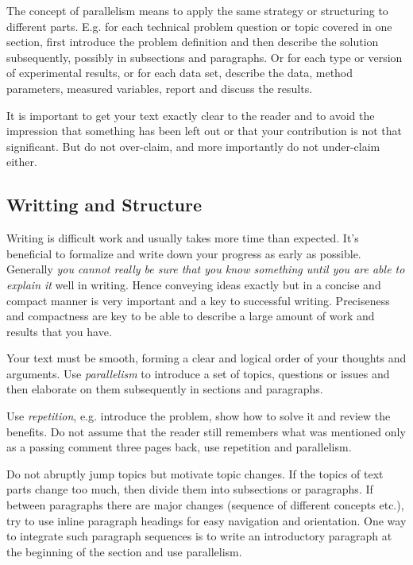 \documentclass[11pt, a4paper,oneside,chapterprefix=false]{scrbook}
\begin{document}
The concept of parallelism means to apply the same strategy or structuring to different parts. E.g. for each technical problem question or topic covered in one section, first introduce the problem definition and then describe the solution subsequently, possibly in subsections and paragraphs. Or for each type or version of experimental results, or for each data set, describe the data, method parameters, measured variables, report and discuss the results.

It is important to get your text exactly clear to the reader and to avoid the impression that something has been left out or that your contribution is not that significant. But do not over-claim, and more importantly do not under-claim either.

\subsection*{Writting and Structure}

Writing is difficult work and usually takes more time than expected. It's beneficial to formalize and write down your progress as early as possible. Generally \emph{you cannot really be sure that you know something until you are able to explain it} well in writing. Hence conveying ideas exactly but in a concise and compact manner is very important and a key to successful writing. Preciseness and compactness are key to be able to describe a large amount of work and results that you have.

Your text must be smooth, forming a clear and logical order of your thoughts and arguments. Use \emph{parallelism} to introduce a set of topics, questions or issues and then elaborate on them subsequently in sections and paragraphs.

Use \emph{repetition}, e.g. introduce the problem, show how to solve it and review the benefits. Do not assume that the reader still remembers what was mentioned only as a passing comment three pages back, use repetition and parallelism.

Do not abruptly jump topics but motivate topic changes. If the topics of text parts change too much, then divide them into subsections or paragraphs. If between paragraphs there are major changes (sequence of different concepts etc.), try to use inline paragraph headings for easy navigation and orientation. One way to integrate such paragraph sequences is to write an introductory paragraph at the beginning of the section and use parallelism.
\end{document}
